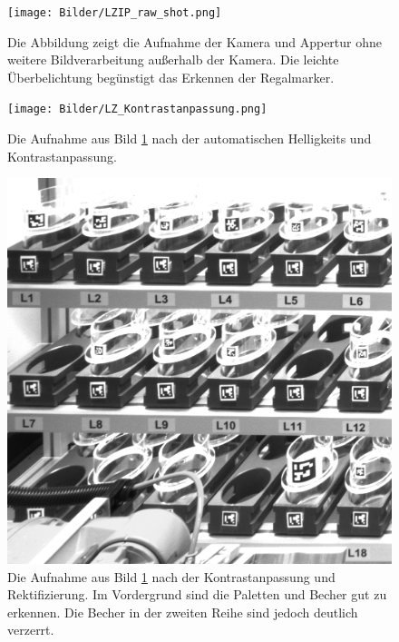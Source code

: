     \begin{figure}
        \caption[Bildaufnahme aus der Lagerzelle von der Übersichtskamera.]
        {\small Die Abbildung zeigt die Aufnahme der Kamera und Appertur ohne weitere Bildverarbeitung außerhalb der Kamera. Die leichte Überbelichtung begünstigt das Erkennen der Regalmarker.}\label{fig:figure12}
        \texttt{[image: Bilder/LZIP\_raw\_shot.png]}
        \centering
    \end{figure}

    \begin{figure}
        \caption[Bildaufnahme aus der Lagerzelle nach der Kontrastanpassung.]
        {\small Die Aufnahme aus Bild \ref{fig:figure12} nach der automatischen Helligkeits und Kontrastanpassung.}\label{fig:figure13}
        \texttt{[image: Bilder/LZ\_Kontrastanpassung.png]}
        \centering
    \end{figure}

    \begin{figure}
        \caption[Bild aus der Lagerzelle nach der Rektifizierung und Zuschnitt auf relevanten Regalbereich]
        {\small Die Aufnahme aus Bild \ref{fig:figure12} nach der Kontrastanpassung und Rektifizierung. Im Vordergrund sind die Paletten und Becher gut zu erkennen. Die Becher in der zweiten Reihe sind jedoch deutlich verzerrt.}\label{fig:figure14}
        \includegraphics[width = \textwidth]{Bilder/LZ_transformed.png}
        \centering
    \end{figure}

